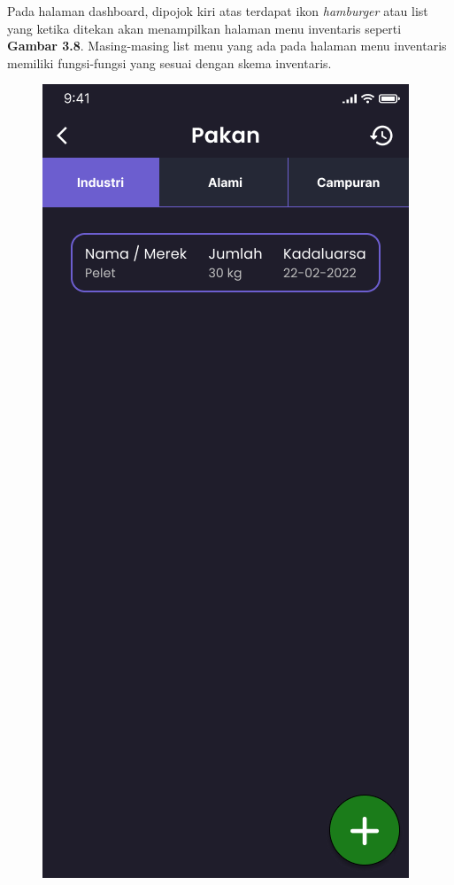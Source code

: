 \begin{enumerate}
\begin{enumerate}
		Pada halaman dashboard, dipojok kiri atas terdapat ikon \textit{hamburger} atau list yang ketika ditekan akan menampilkan halaman menu inventaris seperti \textbf{Gambar 3.8}. Masing-masing list menu yang ada pada halaman menu inventaris memiliki fungsi-fungsi yang sesuai dengan skema inventaris.

		\begin{figure}[H]
			  \includegraphics[width=\linewidth]{gambar/sprint1/mockup_detail_feed.png}

\end{figure}
\end{enumerate}
\end{enumerate}
